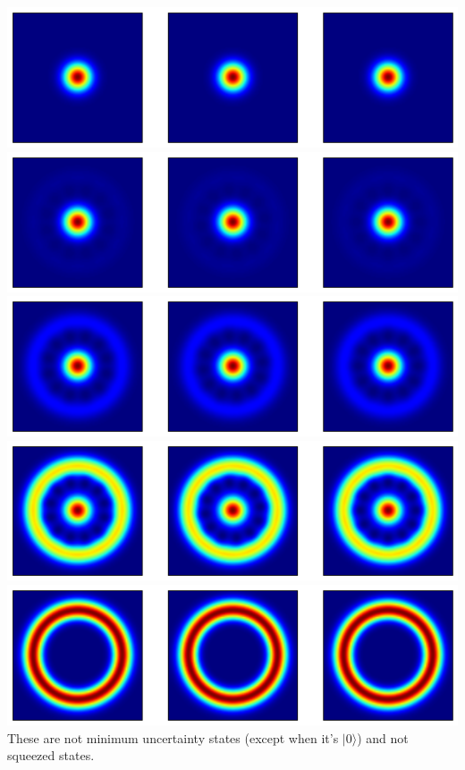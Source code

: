 \documentclass[10pt,fleqn]{article}
\begin{document}
\subsection{}
\includegraphics[width=15cm]{3-1-0_4.png}\\
\includegraphics[width=15cm]{3-1-1_4.png}\\
\includegraphics[width=15cm]{3-1-2_4.png}\\
\includegraphics[width=15cm]{3-1-3_4.png}\\
\includegraphics[width=15cm]{3-1-4_4.png}\\
These are not minimum uncertainty states (except when it's $|0\rangle$) and not squeezed states.
\end{document}
